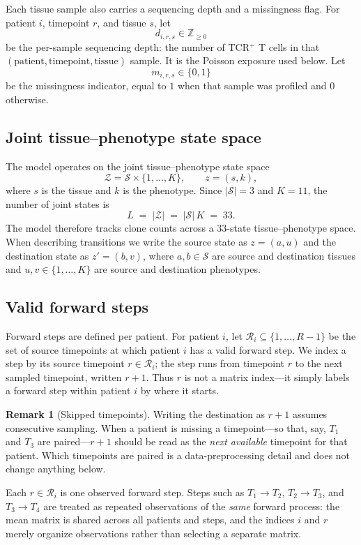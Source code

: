 \documentclass[11pt]{article}
\newcommand{\Znn}{\mathbb{Z}_{\geq 0}}            %
\newcommand{\Zsp}{\mathcal{Z}}                    %
\newcommand{\Ssp}{\mathcal{S}}                    %
\newcommand{\Rsp}{\mathcal{R}}                    %
\theoremstyle{definition}
\newtheorem*{remark}{Remark}
\begin{document}
Each tissue sample also carries a sequencing depth and a missingness flag. For
patient $i$, timepoint $r$, and tissue $s$, let
\[
  d_{i,r,s} \in \Znn
\]
be the per-sample sequencing depth: the number of TCR$^+$ T cells in that
$(\text{patient},\text{timepoint},\text{tissue})$ sample. It is the
Poisson exposure used below. Let
\[
  m_{i,r,s} \in \{0,1\}
\]
be the missingness indicator, equal to $1$ when that sample was profiled and
$0$ otherwise.

\subsection{Joint tissue--phenotype state space}

The model operates on the joint tissue--phenotype state space
\[
  \Zsp = \Ssp \times \{1,\ldots,K\},
  \qquad
  z = (s,k),
\]
where $s$ is the tissue and $k$ is the phenotype. Since $|\Ssp| = 3$ and
$K = 11$, the number of joint states is
\[
  L \;=\; |\Zsp| \;=\; |\Ssp|\,K \;=\; 33 .
\]
The model therefore tracks clone counts across a $33$-state
tissue--phenotype space. When describing transitions we write the source state
as $z = (a,u)$ and the destination state as $z' = (b,v)$, where $a,b \in \Ssp$
are source and destination tissues and $u,v \in \{1,\ldots,K\}$ are source and
destination phenotypes.

\subsection{Valid forward steps}

Forward steps are defined per patient. For patient $i$, let
$\Rsp_i \subseteq \{1,\ldots,R-1\}$ be the set of source timepoints at which
patient $i$ has a valid forward step. We index a step by its source timepoint
$r \in \Rsp_i$; the step runs from timepoint $r$ to the next sampled timepoint,
written $r+1$. Thus $r$ is not a matrix index---it simply labels a forward step
within patient $i$ by where it starts.

\begin{remark}[Skipped timepoints]
Writing the destination as $r+1$ assumes consecutive sampling. When a patient is
missing a timepoint---so that, say, $T_1$ and $T_3$ are paired---$r+1$ should be
read as the \emph{next available} timepoint for that patient. Which timepoints
are paired is a data-preprocessing detail and does not change anything below.
\end{remark}

Each $r \in \Rsp_i$ is one observed forward step. Steps such as
$T_1 \!\to\! T_2$, $T_2 \!\to\! T_3$, and $T_3 \!\to\! T_4$ are treated as
repeated observations of the \emph{same} forward process: the mean matrix is
shared across all patients and steps, and the indices $i$ and $r$ merely
organize observations rather than selecting a separate matrix.
\end{document}
